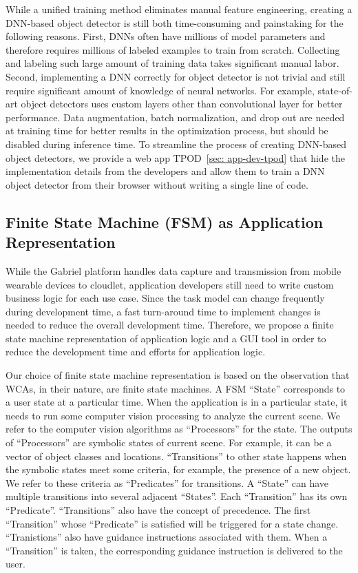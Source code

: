 While a unified training method eliminates manual feature engineering, creating
a DNN-based object detector is still both time-consuming and painstaking for the
following reasons. First, DNNs often have millions of model parameters and
therefore requires millions of labeled examples to train from scratch.
Collecting and labeling such large amount of training data takes significant
manual labor. Second, implementing a DNN correctly for object detector is not
trivial and still require significant amount of knowledge of neural networks.
For example, state-of-art object detectors uses custom layers other than
convolutional layer for better performance. Data augmentation, batch
normalization, and drop out are needed at training time for better results in
the optimization process, but should be disabled during inference time. To
streamline the process of creating DNN-based object detectors, we provide a web
app TPOD~\ref{sec: app-dev-tpod} that hide the implementation details from the
developers and allow them to train a DNN object detector from their browser
without writing a single line of code.

\subsection{Finite State Machine (FSM) as Application Representation}

While the Gabriel platform handles data capture and transmission from mobile
wearable devices to cloudlet, application developers still need to write custom
business logic for each use case. Since the task model can change frequently
during development time, a fast turn-around time to implement changes is needed
to reduce the overall development time. Therefore, we propose a finite state
machine representation of application logic and a GUI tool in order to reduce
the development time and efforts for application logic. 

Our choice of finite state machine representation is based on the observation
that WCAs, in their nature, are finite state machines. A FSM ``State''
corresponds to a user state at a particular time. When the application is in a
particular state, it needs to run some computer vision processing to analyze the
current scene. We refer to the computer vision algorithms as ``Processors'' for
the state. The outputs of ``Processors'' are symbolic states of current scene.
For example, it can be a vector of object classes and locations. ``Transitions''
to other state happens when the symbolic states meet some criteria, for example,
the presence of a new object. We refer to these criteria as ``Predicates'' for
transitions. A ``State'' can have multiple transitions into several adjacent
``States''. Each ``Transition'' has its own ``Predicate''. ``Transitions'' also
have the concept of precedence. The first ``Transition'' whose ``Predicate'' is
satisfied will be triggered for a state change. ``Tranistions'' also have
guidance instructions associated with them. When a ``Transition'' is taken, the
corresponding guidance instruction is delivered to the user.


